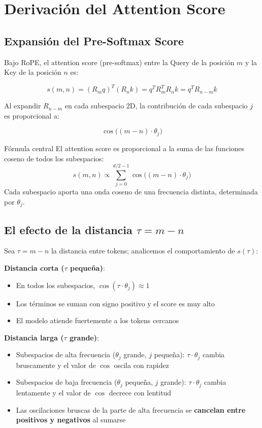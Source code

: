 \section{Derivación del Attention Score}

\subsection{Expansión del Pre-Softmax Score}

Bajo RoPE, el attention score (pre-softmax) entre la Query de la posición $m$ y la Key de la posición $n$ es:

$$
s(m,n) = (R_m q)^T (R_n k) = q^T R_m^T R_n k = q^T R_{n-m} k
$$

Al expandir $R_{n-m}$ en cada subespacio 2D, la contribución de cada subespacio $j$ es proporcional a:

$$
\cos\big((m-n) \cdot \theta_j\big)
$$

\begin{importantbox}{Fórmula central}
El attention score es proporcional a la suma de las funciones coseno de todos los subespacios:
$$
s(m,n) \propto \sum_{j=0}^{d/2-1} \cos\big((m-n) \cdot \theta_j\big)
$$
Cada subespacio aporta una onda coseno de una frecuencia distinta, determinada por $\theta_j$.
\end{importantbox}

\subsection{El efecto de la distancia $\tau = m - n$}

Sea $\tau = m - n$ la distancia entre tokens; analicemos el comportamiento de $s(\tau)$:

\textbf{Distancia corta ($\tau$ pequeña)}:
\begin{itemize}
  \item En todos los subespacios, $\cos(\tau \cdot \theta_j) \approx 1$
  \item Los términos se suman con signo positivo y el score es muy alto
  \item El modelo atiende fuertemente a los tokens cercanos
\end{itemize}

\textbf{Distancia larga ($\tau$ grande)}:
\begin{itemize}
  \item Subespacios de alta frecuencia ($\theta_j$ grande, $j$ pequeña): $\tau \cdot \theta_j$ cambia bruscamente y el valor de $\cos$ oscila con rapidez
  \item Subespacios de baja frecuencia ($\theta_j$ pequeña, $j$ grande): $\tau \cdot \theta_j$ cambia lentamente y el valor de $\cos$ decrece con lentitud
  \item Las oscilaciones bruscas de la parte de alta frecuencia se \textbf{cancelan entre positivos y negativos} al sumarse
\end{itemize}

